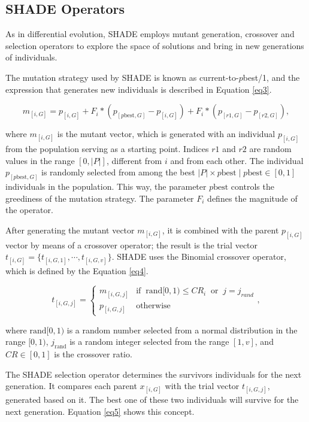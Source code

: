 \documentclass[review]{elsarticle}
\begin{document}
\subsection{SHADE Operators}

As in differential evolution, SHADE employs mutant generation, crossover and selection operators to explore the space of solutions and bring in new generations of individuals.

The mutation strategy used by SHADE is known as current-to-$p$best/1, and the expression that generates new individuals is described in Equation \eqref{eq3}.

\begin{equation}
m_{[i,G]} = p_{[i,G]} + F_i * (p_{[p\text{best}, G]} - p_{[i,G]}) + F_i * (p_{[r1, G]} - p_{[r2,G]}),
\label{eq3}
\end{equation}

\noindent where $m_{[i,G]}$ is the mutant vector, which is generated with an individual $p_{[i,G]}$ from the population serving as a starting point. Indices $r1$ and $r2$ are random values in the range $[0,|P|]$, different from $i$ and from each other. The individual $p_{[p\text{best}, G]}$ is randomly selected from among the best $|P| \times p\text{best}\;|\;p\text{best}\in [0,1]$ individuals in the population. This way, the parameter $p\text{best}$ controls the greediness of the mutation strategy. The parameter $F_i$ defines the magnitude of the operator.

After generating the mutant vector $m_{[i,G]}$, it is combined with the parent $p_{[i,G]}$ vector by means of a crossover operator; the result is the trial vector $t_{[i,G]} = \{t_{[i,G,1]}, \cdots, t_{[i,G,v]}\}$. SHADE uses the Binomial crossover operator, which is defined by the Equation \eqref{eq4}.

\begin{equation}
t_{[i,G,j]} = \left\{ \begin{array}{lc}
m_{[i,G,j]} &   \text{if} \;\; \text{rand}[0,1) \le CR_i \;\; \text{or} \;\;j = j_{rand} \\
p_{[i,G,j]} &  \text{otherwise}
\end{array}
\right.,
\label{eq4}
\end{equation}

\noindent where $\text{rand}[0,1)$ is a random number selected from a normal distribution in the range $[0,1)$, $j_\text{rand}$ is a random integer selected from the range $[1,v]$, and $CR \in [0,1]$ is the crossover ratio.

The SHADE selection operator determines the survivors individuals for the next generation. It compares each parent $x_{[i,G]}$ with the trial vector $t_{[i,G,j]}$, generated based on it. The best one of these two individuals will survive for the next generation. Equation \eqref{eq5} shows this concept.
\end{document}
